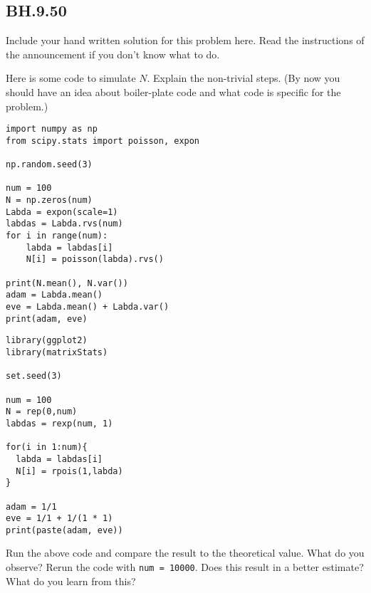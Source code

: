 

\subsection{BH.9.50}


\begin{exercise}
Include your hand written solution for this problem here. Read the instructions of the announcement if you don't know what to do.
\end{exercise}

\begin{exercise}
Here is some code to simulate $N$.  Explain the non-trivial steps. (By now you should have an idea about boiler-plate code and what code is specific for the problem.)

\begin{verbatim}
import numpy as np
from scipy.stats import poisson, expon

np.random.seed(3)

num = 100
N = np.zeros(num)
Labda = expon(scale=1)
labdas = Labda.rvs(num)
for i in range(num):
    labda = labdas[i]
    N[i] = poisson(labda).rvs()

print(N.mean(), N.var())
adam = Labda.mean()
eve = Labda.mean() + Labda.var()
print(adam, eve)
\end{verbatim}

\begin{verbatim}
library(ggplot2)
library(matrixStats)

set.seed(3)

num = 100
N = rep(0,num)
labdas = rexp(num, 1)

for(i in 1:num){
  labda = labdas[i]
  N[i] = rpois(1,labda)
}

adam = 1/1
eve = 1/1 + 1/(1 * 1)
print(paste(adam, eve))
\end{verbatim}

\end{exercise}

\begin{exercise}
Run the above code and compare the result to the theoretical value. What do you observe? Rerun the code with \texttt{num = 10000}. Does this result in a better estimate? What do you learn from this?
\end{exercise}

